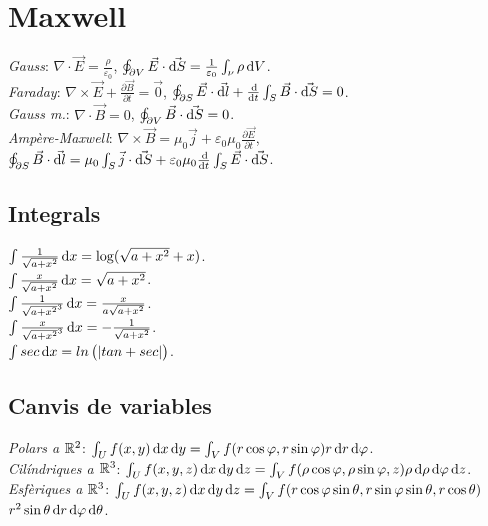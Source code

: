 \section{Maxwell}
\emph{Gauss}: $\nabla \cdot \vec{E} = \frac{\rho}{\varepsilon_0} $, $\oint_{\partial V} \vec{E}\cdot \vec{\dif S} = \frac{1}{\varepsilon_0} \int_\nu \rho \dif V$.\\
\emph{Faraday}: $\nabla \times \vec{E} +  \frac{\partial{\vec{B}}}{\partial t} = \vec{0}$,
                $\oint_{\partial S} \vec{E} \cdot \vec{\dif l} + 
                \frac{\dif}{\dif t} \int_S \vec{B} \cdot \vec{\dif S} = 0$.\\
\emph{Gauss m.}: $\nabla \cdot \vec{B} = 0$, $\oint_{\partial V} \vec{B} \cdot
                \vec{\dif S} = 0$.\\
\emph{Ampère-Maxwell}: $\nabla \times \vec{B} = \mu_0 \vec{j} + \varepsilon_0\mu_0
                    \frac{\partial{\vec{E}}}{\partial t}$, $\oint_{\partial{S}}
                    \vec{B} \cdot \vec{\dif l} = \mu_0 
                    \int_S \vec{j} \cdot \vec{\dif S} + \varepsilon_0 \mu_0
                    \frac{\dif}{\dif t} \int_S \vec{E} \cdot \vec{\dif S}$.

\addtocounter{section}{1}
\noindent\makebox[\linewidth]{\rule{\linewidth}{0.5pt}}

\subsection{Integrals}
\ci $\int \frac{1}{\sqrt{a+x^2}}\dif x = \log (\sqrt{a+x^2} + x)$. \\
\ci $\int \frac{x}{\sqrt{a+x^2}}\dif x = \sqrt{a+x^2}$. \\
\ci $\int \frac{1}{\sqrt{a+x^2}^3}\dif x = \frac{x}{a\sqrt{a+x^2}}$. \\
\ci $\int \frac{x}{\sqrt{a+x^2}^3}\dif x = -\frac{1}{\sqrt{a+x^2}}$.\\
\ci $\int sec \dif x = ln \lp |tan + sec| \rp$.

\subsection{Canvis de variables}
\emph{Polars a $\mathbb{R}^2$}: $\int_U f( x,y ) \dif x\dif y = \int_V f( r\cos\varphi, r\sin\varphi )r \dif r\dif \varphi$. \\
\emph{Cilíndriques a $\mathbb{R}^3$}: $\int_U f( x,y,z ) \dif x\dif y\dif z = \int_V f( \rho\cos\varphi, \rho\sin\varphi, z )\rho \dif \rho\dif \varphi\dif z$. \\
\emph{Esfèriques a $\mathbb{R}^3$}: $\int_U f( x,y,z ) \dif x\dif y\dif z = \int_V f ( r\cos\varphi\sin\theta, r\sin\varphi\sin\theta, r\cos\theta )$ $r^2\sin\theta \dif r\dif \varphi\dif \theta$.

